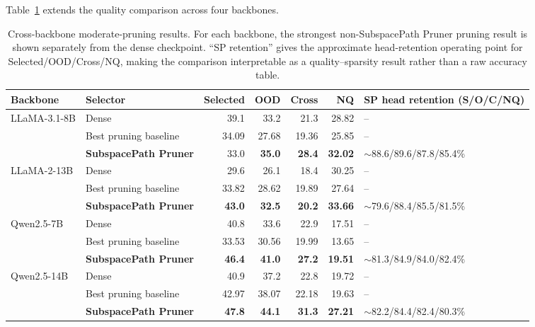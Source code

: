 \documentclass[12pt,a4paper]{article}
\newcommand{\method}[1]{{\sffamily\bfseries\color{MethodBlue}#1}}
\newcommand{\XDB}{\method{XDomainBench}}
\newcommand{\SubspacePath}{\method{SubspacePath Pruner}}
\def\method#1{#1}\def\XDB{XDomainBench}\def\SubspacePath{SubspacePath Pruner}%
\begin{document}
Table~\ref{tab:sp-crossmodel} extends the quality comparison across four backbones.
\begin{table}[tbp]
\centering\singlespacing\scriptsize
\caption{Cross-backbone moderate-pruning results. For each backbone, the strongest non-\SubspacePath{} pruning result is shown separately from the dense checkpoint. ``SP retention'' gives the approximate head-retention operating point for Selected/OOD/Cross/NQ, making the comparison interpretable as a quality--sparsity result rather than a raw accuracy table.}
\label{tab:sp-crossmodel}
\setlength{\tabcolsep}{3.0pt}\renewcommand{\arraystretch}{1.05}
\begin{adjustbox}{max width=\textwidth}
\begin{tabular}{llrrrrl}
\toprule
\textbf{Backbone} & \textbf{Selector} & \textbf{Selected} & \textbf{OOD} & \textbf{Cross} & \textbf{NQ} & \textbf{SP head retention (S/O/C/NQ)}\\
\midrule
\multirow{3}{*}{LLaMA-3.1-8B} & Dense & 39.1 & 33.2 & 21.3 & 28.82 & --\\
& Best pruning baseline & 34.09 & 27.68 & 19.36 & 25.85 & --\\
\rowcolor{SoftBlue}& \textbf{\SubspacePath{}} & 33.0 & \textbf{35.0} & \textbf{28.4} & \textbf{32.02} & $\sim$88.6/89.6/87.8/85.4\%\\
\midrule
\multirow{3}{*}{LLaMA-2-13B} & Dense & 29.6 & 26.1 & 18.4 & 30.25 & --\\
& Best pruning baseline & 33.82 & 28.62 & 19.89 & 27.64 & --\\
\rowcolor{SoftBlue}& \textbf{\SubspacePath{}} & \textbf{43.0} & \textbf{32.5} & \textbf{20.2} & \textbf{33.66} & $\sim$79.6/88.4/85.5/81.5\%\\
\midrule
\multirow{3}{*}{Qwen2.5-7B} & Dense & 40.8 & 33.6 & 22.9 & 17.51 & --\\
& Best pruning baseline & 33.53 & 30.56 & 19.99 & 13.65 & --\\
\rowcolor{SoftBlue}& \textbf{\SubspacePath{}} & \textbf{46.4} & \textbf{41.0} & \textbf{27.2} & \textbf{19.51} & $\sim$81.3/84.9/84.0/82.4\%\\
\midrule
\multirow{3}{*}{Qwen2.5-14B} & Dense & 40.9 & 37.2 & 22.8 & 19.72 & --\\
& Best pruning baseline & 42.97 & 38.07 & 22.18 & 19.63 & --\\
\rowcolor{SoftBlue}& \textbf{\SubspacePath{}} & \textbf{47.8} & \textbf{44.1} & \textbf{31.3} & \textbf{27.21} & $\sim$82.2/84.4/82.4/80.3\%\\
\bottomrule
\end{tabular}
\end{adjustbox}
\end{table}
\end{document}
